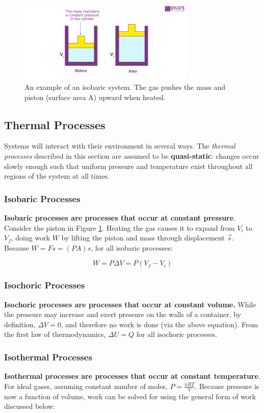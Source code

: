 \documentclass[12pt, a4paper]{article}
\theoremstyle{definition}
\begin{document}
\begin{figure}[t]
    \centering
    \includegraphics[width=0.75\textwidth]{isobaric.png}
    \caption{An example of an isobaric system. The gas pushes the mass and piston (surface area A) upward when heated.}
    \label{fig:isobaric}
\end{figure}


\subsection{Thermal Processes}
Systems will interact with their environment in several ways.
The \textit{thermal processes} described in this section are assumed to be \textbf{quasi-static}: changes occur slowly enough such that uniform pressure and temperature exist throughout all regions of the system at all times.

\subsubsection{Isobaric Processes}
\textbf{Isobaric processes are processes that occur at constant pressure}.
Consider the piston in Figure \ref{fig:isobaric}. 
Heating the gas causes it to expand from $V_i$ to $V_f$, doing work $W$ by lifting the piston and mass through displacement $\vec{s}$.
Because $W = Fs = (PA)s$, for all isobaric processes:

\[W = P\Delta V = P(V_f - V_i)\]

\subsubsection{Isochoric Processes}
\textbf{Isochoric processes are processes that occur at constant volume.}
While the pressure may increase and exert pressure on the walls of a container, by definition, $\Delta V = 0$, and therefore no work is done (via the above equation).
From the first law of thermodynamics, $\Delta U = Q$ for all isochoric processes.

\subsubsection{Isothermal Processes}
\textbf{Isothermal processes are processes that occur at constant temperature}.
For ideal gases, assuming constant number of moles, $P = \frac{nRT}{V}$.
Because pressure is now a function of volume, work can be solved for using the general form of work discussed below:
\end{document}

